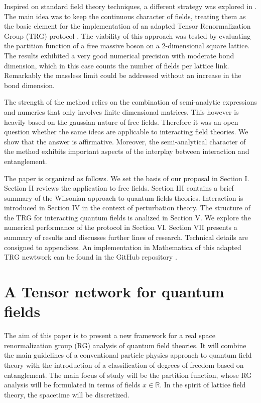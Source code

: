 \documentclass[a4paper,preprintnumbers,nofootinbib,twocolumn]{quantumarticle}
\begin{document}
Inspired on standard field theory techniques, a different strategy was explored in \cite{CS19}. The main idea 
was to keep the continuous character of fields, treating them as the basic element for the implementation of an adapted
Tensor Renormalization Group (TRG) protocol \cite{LN07}. The viability of this approach was tested by evaluating the partition function 
of a free massive boson on a 2-dimensional square lattice. The results exhibited a very good numerical precision with moderate 
bond dimension, which in this case counts the number of fields per lattice link. Remarkably the massless limit could be addressed 
without an increase in the bond dimension.
 
The strength of the method relies on the combination of semi-analytic expressions and numerics that only involves 
finite dimensional matrices. This however is heavily based on the gaussian nature of free 
fields. Therefore it was an open question whether the same ideas %
are applicable to interacting field theories. We show 
that the answer is affirmative. Moreover, the semi-analytical character of the method %
exhibits %
important aspects of the interplay 
between interaction and entanglement.


The paper is organized as follows. We set the basis of our proposal in Section I. Section II reviews the application to free fields. Section III contains a brief summary of the Wilsonian approach
to quantum fields theories.
Interaction is introduced in Section IV in the context of perturbation theory. The structure of the TRG for interacting quantum fields is analized in Section V. 
We explore the numerical performance of the protocol in Section VI.
Section VII presents a summary of results and discusses further lines of research.
Technical details are consigned to appendices.
An implementation in Mathematica of this adapted TRG newtwork can be found in the GitHub repository \cite{repG}. 

\section{A Tensor network for quantum fields}

The aim of this paper is to present a new framework for a real space renormalization group (RG) analysis of quantum field theories.
It will combine the main guidelines of a conventional particle physics approach to quantum field theory \cite{W75,S94} with the introduction
of a classification of degrees of freedom based on entanglement. 
The main focus of study will be the partition function, whose
RG analysis will be formulated in terms of fields $x \in \mathbb{R}$. In the spirit of lattice field theory, the spacetime
will be discretized.
\end{document}
